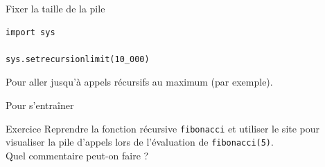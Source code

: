 \documentclass[10pt]{beamer}
\begin{document}
\begin{frame}[fragile]{Fixer la taille de la pile}
\begin{verbatim}
import sys

sys.setrecursionlimit(10_000)
\end{verbatim}

Pour aller jusqu'à  appels récursifs au maximum (par exemple).
\end{frame}




\begin{frame}{Pour s'entraîner}
\begin{alertblock}{Exercice}
Reprendre la fonction récursive \texttt{fibonacci} et utiliser le site  pour visualiser la pile d'appels lors de l'évaluation de \texttt{fibonacci(5)}.\\

Quel commentaire peut-on faire ?
\end{alertblock}
\end{frame}
\end{document}
